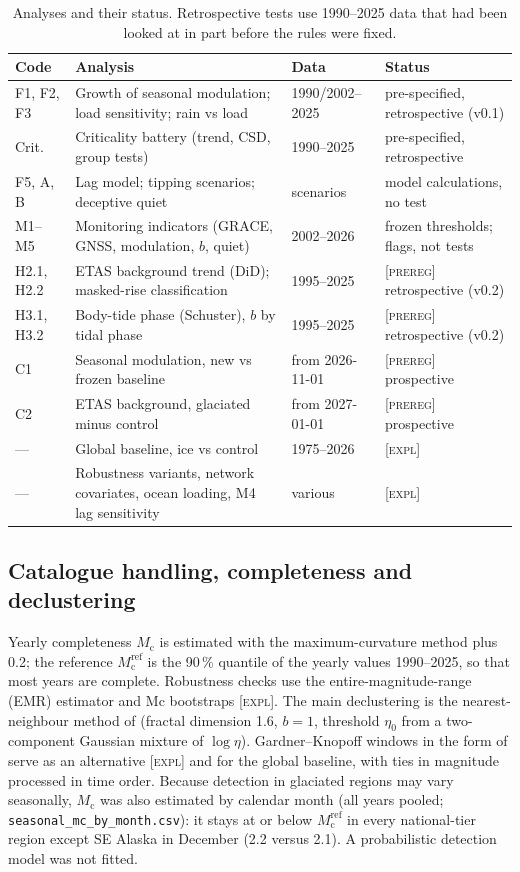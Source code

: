 \documentclass[11pt,a4paper]{article}
\newcommand{\pre}{\textnormal{\textsc{[prereg]}}}
\newcommand{\expl}{\textnormal{\textsc{[expl]}}}
\newcommand{\Mc}{M_\mathrm{c}}
\begin{document}
\begin{table}[t]
\centering\small
\caption{Analyses and their status. Retrospective tests use 1990--2025 data that had been looked at in part before the rules were fixed.}
\label{tab:status}
\begin{tabularx}{\textwidth}{lXll}
\toprule
Code & Analysis & Data & Status\\
\midrule
F1, F2, F3 & Growth of seasonal modulation; load sensitivity; rain vs load & 1990/2002--2025 & pre-specified, retrospective (v0.1)\\
Crit. & Criticality battery (trend, CSD, group tests) & 1990--2025 & pre-specified, retrospective\\
F5, A, B & Lag model; tipping scenarios; deceptive quiet & scenarios & model calculations, no test\\
M1--M5 & Monitoring indicators (GRACE, GNSS, modulation, $b$, quiet) & 2002--2026 & frozen thresholds; flags, not tests\\
H2.1, H2.2 & ETAS background trend (DiD); masked-rise classification & 1995--2025 & \pre{} retrospective (v0.2)\\
H3.1, H3.2 & Body-tide phase (Schuster), $b$ by tidal phase & 1995--2025 & \pre{} retrospective (v0.2)\\
C1 & Seasonal modulation, new vs frozen baseline & from 2026-11-01 & \pre{} prospective\\
C2 & ETAS background, glaciated minus control & from 2027-01-01 & \pre{} prospective\\
--- & Global baseline, ice vs control & 1975--2026 & \expl\\
--- & Robustness variants, network covariates, ocean loading, M4 lag sensitivity & various & \expl\\
\bottomrule
\end{tabularx}
\end{table}

\subsection{Catalogue handling, completeness and declustering}
Yearly completeness $\Mc$ is estimated with the maximum-curvature method plus 0.2; the reference $\Mc^\mathrm{ref}$ is the 90\,\% quantile of the yearly values 1990--2025, so that most years are complete. Robustness checks use the entire-magnitude-range (EMR) estimator and Mc bootstraps \expl. The main declustering is the nearest-neighbour method of \textcite{zaliapin2013} (fractal dimension 1.6, $b=1$, threshold $\eta_0$ from a two-component Gaussian mixture of $\log\eta$). Gardner--Knopoff windows \parencite{gardner1974} in the form of \textcite{vanstiphout2012} serve as an alternative \expl{} and for the global baseline, with ties in magnitude processed in time order. Because detection in glaciated regions may vary seasonally, $\Mc$ was also estimated by calendar month (all years pooled; \texttt{seasonal\_mc\_by\_month.csv}): it stays at or below $\Mc^\mathrm{ref}$ in every national-tier region except SE Alaska in December (2.2 versus 2.1). A probabilistic detection model \parencite{ogata1993} was not fitted.
\end{document}
